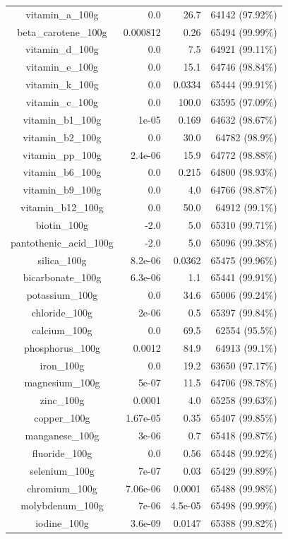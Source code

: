 \documentclass[11pt]{article}
\begin{document}
\begin{center}
\begin{longtable}{|c|r|r|r|}
vitamin\_a\_100g& 0.0& 26.7& 64142 (97.92\%)\\
beta\_carotene\_100g& 0.000812& 0.26& 65494 (99.99\%)\\
vitamin\_d\_100g& 0.0& 7.5& 64921 (99.11\%)\\
vitamin\_e\_100g& 0.0& 15.1& 64746 (98.84\%)\\
vitamin\_k\_100g& 0.0& 0.0334& 65444 (99.91\%)\\
vitamin\_c\_100g& 0.0& 100.0& 63595 (97.09\%)\\
vitamin\_b1\_100g& 1e-05& 0.169& 64632 (98.67\%)\\
vitamin\_b2\_100g& 0.0& 30.0& 64782 (98.9\%)\\
vitamin\_pp\_100g& 2.4e-06& 15.9& 64772 (98.88\%)\\
vitamin\_b6\_100g& 0.0& 0.215& 64800 (98.93\%)\\
vitamin\_b9\_100g& 0.0& 4.0& 64766 (98.87\%)\\
vitamin\_b12\_100g& 0.0& 50.0& 64912 (99.1\%)\\
biotin\_100g& -2.0& 5.0& 65310 (99.71\%)\\
pantothenic\_acid\_100g& -2.0& 5.0& 65096 (99.38\%)\\
silica\_100g& 8.2e-06& 0.0362& 65475 (99.96\%)\\
bicarbonate\_100g& 6.3e-06& 1.1& 65441 (99.91\%)\\
potassium\_100g& 0.0& 34.6& 65006 (99.24\%)\\
chloride\_100g& 2e-06& 0.5& 65397 (99.84\%)\\
calcium\_100g& 0.0& 69.5& 62554 (95.5\%)\\
phosphorus\_100g& 0.0012& 84.9& 64913 (99.1\%)\\
iron\_100g& 0.0& 19.2& 63650 (97.17\%)\\
magnesium\_100g& 5e-07& 11.5& 64706 (98.78\%)\\
zinc\_100g& 0.0001& 4.0& 65258 (99.63\%)\\
copper\_100g& 1.67e-05& 0.35& 65407 (99.85\%)\\
manganese\_100g& 3e-06& 0.7& 65418 (99.87\%)\\
fluoride\_100g& 0.0& 0.56& 65448 (99.92\%)\\
selenium\_100g& 7e-07& 0.03& 65429 (99.89\%)\\
chromium\_100g& 7.06e-06& 0.0001& 65488 (99.98\%)\\
molybdenum\_100g& 7e-06& 4.5e-05& 65498 (99.99\%)\\
iodine\_100g& 3.6e-09& 0.0147& 65388 (99.82\%)\\

\end{longtable}
\end{center}
\end{document}
